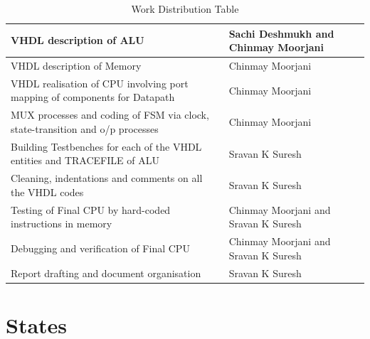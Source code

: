 \documentclass{article}
\begin{document}
\begin{table}[htb]
\begin{tabularx}{\textwidth}{|>{\centering\arraybackslash}X|>{\centering\arraybackslash}p{4cm}|}
VHDL description of ALU                                                                    & Sachi Deshmukh and Chinmay Moorjani  \\ \hline
VHDL description of Memory                                                                 & Chinmay Moorjani                     \\ \hline
VHDL realisation of CPU involving port mapping of components for Datapath            & Chinmay Moorjani                     \\ \hline
MUX processes and coding of FSM via clock, state-transition and o/p processes    & Chinmay Moorjani                     \\ \hline
Building Testbenches for each of the VHDL entities and TRACEFILE of ALU                                    & Sravan K Suresh                      \\ \hline
Cleaning, indentations and comments on all the VHDL codes                                      & Sravan K Suresh                      \\ \hline
Testing of Final CPU by hard-coded instructions in memory                                  & Chinmay Moorjani and Sravan K Suresh \\ \hline
Debugging and verification of Final CPU                                                    & Chinmay Moorjani and Sravan K Suresh       \\ \hline
Report drafting and document organisation                                                  & Sravan K Suresh                      \\ \hline
\end{tabularx}
\caption{Work Distribution Table}
\end{table}

\section{States}
\end{document}
